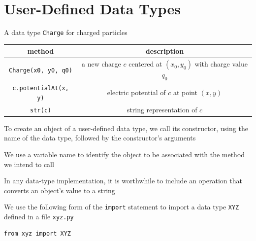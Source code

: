 \documentclass[8pt,a4paper,compress]{beamer}
\begin{document}
\section{User-Defined Data Types}
\begin{frame}[fragile]
\pause

A data type \lstinline{Charge} for charged particles
\begin{center}
\begin{tabular}{cc}
method & description \\ \hline
\lstinline$Charge(x0, y0, q0)$ & a new charge $c$ centered at $(x_0, y_0)$ with charge value $q_0$ \\
\lstinline$c.potentialAt(x, y)$ & electric potential of $c$ at point $(x, y)$ \\
\lstinline$str(c)$ & string representation of $c$
\end{tabular} 
\end{center}

\pause
\bigskip

To create an object of a user-defined data type, we call its constructor, using the name of the data type, followed by the constructor's arguments

\pause
\bigskip

We use a variable name to identify the object to be associated with the method we intend to call

\pause
\bigskip

In any data-type implementation, it is worthwhile to include an operation that converts an object's value to a string

\pause
\bigskip

We use the following form of the \lstinline{import} statement to import a data type \lstinline{XYZ} defined in a file \lstinline{xyz.py}
\begin{lstlisting}[language={}]
from xyz import XYZ
\end{lstlisting}
\end{frame}
\end{document}
